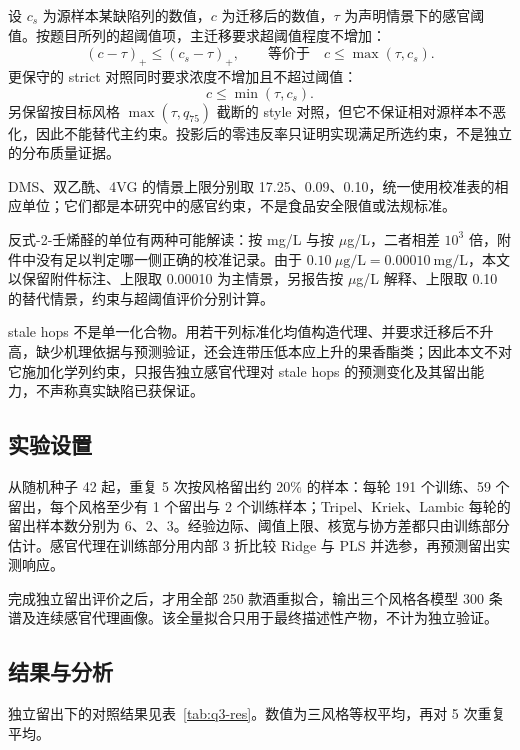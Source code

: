 \documentclass[UTF8,a4paper,zihao=-4]{ctexart}
\numberwithin{figure}{section}
\numberwithin{table}{section}
\numberwithin{equation}{section}
\begin{document}
设 $c_s$ 为源样本某缺陷列的数值，$c$ 为迁移后的数值，$\tau$ 为声明情景下的感官阈值。按题目所列的超阈值项，主迁移要求超阈值程度不增加：
\begin{equation}
\left(c-\tau\right)_{+}\le\left(c_s-\tau\right)_{+},\qquad\text{等价于}\quad c\le\max\left(\tau,c_s\right).
\label{eq:defect-main}
\end{equation}
更保守的 strict 对照同时要求浓度不增加且不超过阈值：
\begin{equation}
c\le\min\left(\tau,c_s\right).
\label{eq:defect-strict}
\end{equation}
另保留按目标风格 $\max(\tau,q_{75})$ 截断的 style 对照，但它不保证相对源样本不恶化，因此不能替代主约束。投影后的零违反率只证明实现满足所选约束，不是独立的分布质量证据。

DMS、双乙酰、4VG 的情景上限分别取 17.25、0.09、0.10，统一使用校准表的相应单位；它们都是本研究中的感官约束，不是食品安全限值或法规标准。

反式-2-壬烯醛的单位有两种可能解读：按 mg/L 与按 $\mu$g/L，二者相差 $10^{3}$ 倍，附件中没有足以判定哪一侧正确的校准记录。由于 $0.10\ \mu\mathrm{g/L}=0.00010\ \mathrm{mg/L}$，本文以保留附件标注、上限取 0.00010 为主情景，另报告按 $\mu$g/L 解释、上限取 0.10 的替代情景，约束与超阈值评价分别计算。

stale hops 不是单一化合物。用若干列标准化均值构造代理、并要求迁移后不升高，缺少机理依据与预测验证，还会连带压低本应上升的果香酯类；因此本文不对它施加化学列约束，只报告独立感官代理对 stale hops 的预测变化及其留出能力，不声称真实缺陷已获保证。

\subsection{实验设置}

从随机种子 42 起，重复 5 次按风格留出约 20\% 的样本：每轮 191 个训练、59 个留出，每个风格至少有 1 个留出与 2 个训练样本；Tripel、Kriek、Lambic 每轮的留出样本数分别为 6、2、3。经验边际、阈值上限、核宽与协方差都只由训练部分估计。感官代理在训练部分用内部 3 折比较 Ridge 与 PLS 并选参，再预测留出实测响应。

完成独立留出评价之后，才用全部 250 款酒重拟合，输出三个风格各模型 300 条谱及连续感官代理画像。该全量拟合只用于最终描述性产物，不计为独立验证。

\subsection{结果与分析}

独立留出下的对照结果见表~\ref{tab:q3-res}。数值为三风格等权平均，再对 5 次重复平均。
\end{document}
